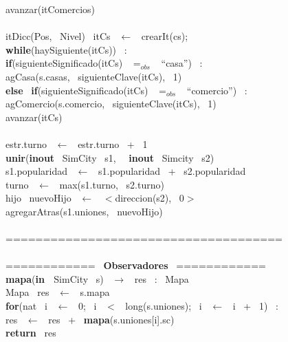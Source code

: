 \indent \indent avanzar(itComercios)\\
\\
\indent 
\indent itDicc(Pos, \ Nivel) \ itCs \ $\leftarrow$ \ crearIt(cs);\\
\indent \textbf{while}(haySiguiente(itCs)) \ :\\
\indent \indent \textbf{if}(siguienteSignificado(itCs) \ $=_{obs}$ \ ``casa'') \ :\\
\indent \indent \indent agCasa(s.casas, \ siguienteClave(itCs), \ 1)\\
\indent \indent \textbf{else} \ \textbf{if}(siguienteSignificado(itCs) \ $=_{obs}$ \ ``comercio'') \ :\\
\indent \indent \indent agComercio(s.comercio, \ siguienteClave(itCs), \ 1)\\
\indent \indent avanzar(itCs)\\
\\
\indent estr.turno \ $\longleftarrow$ \ estr.turno \ + \ 1 \ 
\noindent\makebox[\linewidth]{\rule{\textwidth}{0.4pt}}
\\
\noindent\makebox[\linewidth]{\rule{\textwidth}{0.4pt}}
\textbf{unir}(\textbf{inout} \ SimCity \ s1, \  \ \textbf{inout} \ Simcity \ s2)\\
\indent s1.popularidad \ $\leftarrow$ \ s1.popularidad \ + \ s2.popularidad\\
\indent turno \ $\leftarrow$ \ max(s1.turno, \ s2.turno)\\
\indent hijo \ nuevoHijo \ $\leftarrow$ \ $<$direccion(s2), \ 0$>$\\
\indent agregarAtras(s1.uniones, \ nuevoHijo)\\
\indent \\
\noindent\makebox[\linewidth]{\rule{\textwidth}{0.4pt}}
===================================== \ \\
\\
============ \ \textbf{Observadores} \ ============ \ \\
\noindent\makebox[\linewidth]{\rule{\textwidth}{0.4pt}}
\textbf{mapa}(\textbf{in \ }SimCity \ s) \ $\rightarrow $ \ res \ : \ Mapa \ \\
\indent Mapa \ res \ $\leftarrow$ \ s.mapa\\
\indent \textbf{for}(nat \ i \ $\leftarrow$ \ 0; \ i \ $<$ \ long(s.uniones); \ i \ $\leftarrow$ \ i \ + \ 1) \ : \ \\
\indent \indent res \ $\leftarrow$ \ res \ + \ \textbf{mapa}(s.uniones[i].sc)\\
\indent \textbf{return} \ res\\
